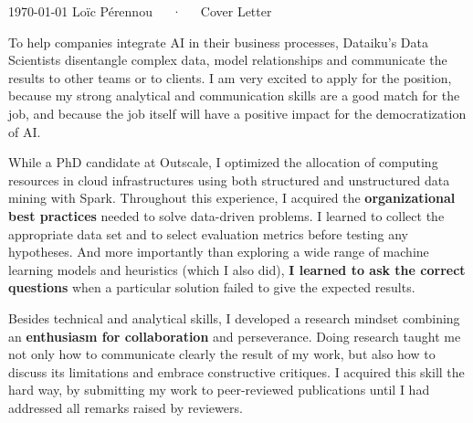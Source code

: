 \documentclass[11pt, a4paper]{awesome-cv}
\newcommand{\company}{Dataiku}
\newcommand{\job}{Data Scientist}
\begin{document}
\makecvheader[R]

\makecvfooter
  {\today}
  {Loïc Pérennou~~~·~~~Cover Letter}
  {}

\makelettertitle

\begin{cvletter}
  To help companies integrate AI in their business processes, \company's \job s disentangle complex data, model relationships and communicate the results to other teams or to clients. 
  I am very excited to apply for the position, because my strong analytical and communication skills are a good match for the job, and because the job itself will have a positive impact for the democratization of AI.  

  While a PhD candidate at Outscale, I optimized the allocation of computing resources in cloud infrastructures using both structured and unstructured data mining with Spark.  
Throughout this experience, I acquired the \textbf{organizational best practices} needed to solve data-driven problems.  
I learned to collect the appropriate data set and to select evaluation metrics before testing any hypotheses. 
And more importantly than exploring a wide range of machine learning models and heuristics (which I also did), \textbf{I learned to ask the correct questions} when a particular solution failed to give the expected results.  

Besides technical and analytical skills, I developed a research mindset combining an \textbf{enthusiasm for collaboration} and perseverance.  
Doing research taught me not only how to communicate clearly the result of my work, but also how to discuss its limitations and embrace constructive critiques.  
I acquired this skill the hard way, by submitting my work to peer-reviewed publications until I had addressed all remarks raised by reviewers. 


\end{cvletter}
\end{document}
